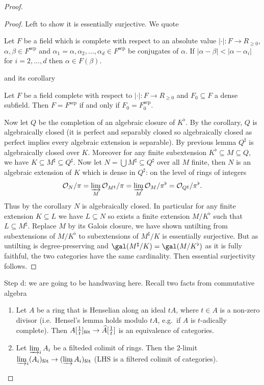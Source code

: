 \documentclass[a4paper]{article}
\newcommand{\tilt}{\flat} %
\renewcommand*{\O}{\mathcal{O}}
\renewcommand*{\O}{\mathcal{O}}
\begin{document}
\begin{proof}
\begin{proof}
    Left to show it is essentially surjective. We quote

    \begin{lemma}
      Let \(F\) be a field which is complete with respect to an absolute value \(|\cdot|: F \to R_{\geq 0}\), \(\alpha, \beta \in F^{\text{sep}}\) and \(\alpha_1 = \alpha, \alpha_2, \dots, \alpha_d \in F^{\text{sep}}\) be conjugates of \(\alpha\). If \(|\alpha - \beta| < |\alpha - \alpha_i|\) for \(i = 2, \dots, d\) then \(\alpha \in F(\beta)\).
    \end{lemma}

    and its corollary

    \begin{corollary}
      Let \(F\) be a field complete with respect to \(|\cdot|: F \to R_{\geq 0}\) and \(F_0 \subseteq F\) a dense subfield. Then \(F = F^{\text{sep}}\) if and only if \(F_0 = F_0^{\text{sep}}\).
    \end{corollary}

    Now let \(Q\) be the completion of an algebraic closure of \(K^\tilt\). By the corollary, \(Q\) is algebraically closed (it is perfect and separably closed so algebraically closed as perfect implies every algebraic extension is separable). By previous lemma \(Q^\sharp\) is algebraically closed over \(K\). Moreover for any finite subextension \(K^\tilt \subseteq M \subseteq Q\), we have \(K \subseteq M^\sharp \subseteq Q^\sharp\). Now let \(N = \bigcup M^\sharp \subseteq Q^\sharp\) over all \(M\) finite, then \(N\) is an algebraic extension of \(K\) which is dense in \(Q^\sharp\): on the level of rings of integers
    \[
      \O_N/\pi = \varinjlim_M \O_{M^\sharp}/\pi = \varinjlim_M \O_M/\pi^\tilt = \O_{Q^\sharp}/\pi^\tilt.
    \]
    Thus by the corollary \(N\) is algebraically closed. In particular for any finite extension \(K \subseteq L\) we have \(L \subseteq N\) so exists a finite extension \(M/K^\tilt\) such that \(L \subseteq M^\sharp\). Replace \(M\) by its Galois closure, we have shown untilting from subextensions of \(M/K^\tilt\) to subextensions of \(M^\sharp/K\) is essentially surjective. But as untilting is degree-preserving and \(\gal(M^\sharp/K) = \gal(M/K^\tilt)\) as it is fully faithful, the two categories have the same cardinality. Then essential surjectivity follows.
  \end{proof}

  Step d: we are going to be handwaving here. Recall two facts from commutative algebra
  \begin{enumerate}
  \item Let \(A\) be a ring that is Henselian along an ideal \(t A\), where \(t \in A\) is a non-zero divisor (i.e.\ Hensel's lemma holds modulo \(t A\), e.g.\ if \(A\) is \(t\)-adically complete). Then \(A[\frac{1}{t}]_{\textup{fét}} \to \widehat A[\frac{1}{t}]\) is an equivalence of categories.
  \item Let \(\varinjlim_i A_i\) be a filteded colimit of rings. Then the 2-limit \(\varinjlim_i (A_i)_{\textup{fét}} \to (\varinjlim A_i)_{\textup{fét}}\) (LHS is a filtered colimit of categories).
  \end{enumerate}


\end{proof}
\end{document}
